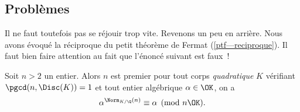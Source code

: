 \subsection{Problèmes}

Il ne faut toutefois pas se réjouir trop vite. Revenons un peu en arrière. Nous avons évoqué la réciproque du petit théorème de Fermat (\ref{ptf—reciproque}). Il faut bien faire attention au fait que l'énoncé suivant est faux~!

\begin{enoncefaux}
	Soit $n>2$ un entier. Alors $n$ est premier \ssi pour tout corps \emph{quadratique} $K$ vérifiant $\pgcd(n, \Disc(K)) = 1$ et tout entier algébrique $\alpha \in \OK$, on a $$\alpha^{\Norm_{K/\Q}(n)} \equiv \alpha \pmod{n\OK}.$$
\end{enoncefaux}
